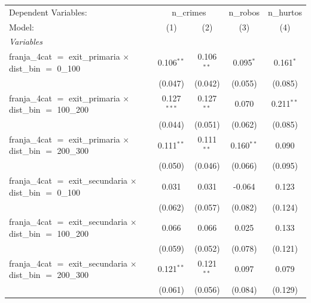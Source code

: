 
\begingroup
\centering
\begin{tabular}{lcccc}
   \tabularnewline \midrule \midrule
   Dependent Variables: & \multicolumn{2}{c}{n\_crimes} & n\_robos & n\_hurtos\\
   Model:                                                                 & (1)            & (2)            & (3)            & (4)\\  
   \midrule
   \emph{Variables}\\
   franja\_4cat $=$ exit\_primaria $\times$ dist\_bin $=$ 0\_100          & 0.106$^{**}$   & 0.106$^{**}$   & 0.095$^{*}$    & 0.161$^{*}$\\   
                                                                          & (0.047)        & (0.042)        & (0.055)        & (0.085)\\   
   franja\_4cat $=$ exit\_primaria $\times$ dist\_bin $=$ 100\_200        & 0.127$^{***}$  & 0.127$^{**}$   & 0.070          & 0.211$^{**}$\\   
                                                                          & (0.044)        & (0.051)        & (0.062)        & (0.085)\\   
   franja\_4cat $=$ exit\_primaria $\times$ dist\_bin $=$ 200\_300        & 0.111$^{**}$   & 0.111$^{**}$   & 0.160$^{**}$   & 0.090\\   
                                                                          & (0.050)        & (0.046)        & (0.066)        & (0.095)\\   
   franja\_4cat $=$ exit\_secundaria $\times$ dist\_bin $=$ 0\_100        & 0.031          & 0.031          & -0.064         & 0.123\\   
                                                                          & (0.062)        & (0.057)        & (0.082)        & (0.124)\\   
   franja\_4cat $=$ exit\_secundaria $\times$ dist\_bin $=$ 100\_200      & 0.066          & 0.066          & 0.025          & 0.133\\   
                                                                          & (0.059)        & (0.052)        & (0.078)        & (0.121)\\   
   franja\_4cat $=$ exit\_secundaria $\times$ dist\_bin $=$ 200\_300      & 0.121$^{**}$   & 0.121$^{**}$   & 0.097          & 0.079\\   
                                                                          & (0.061)        & (0.056)        & (0.084)        & (0.129)\\   

\end{tabular}

